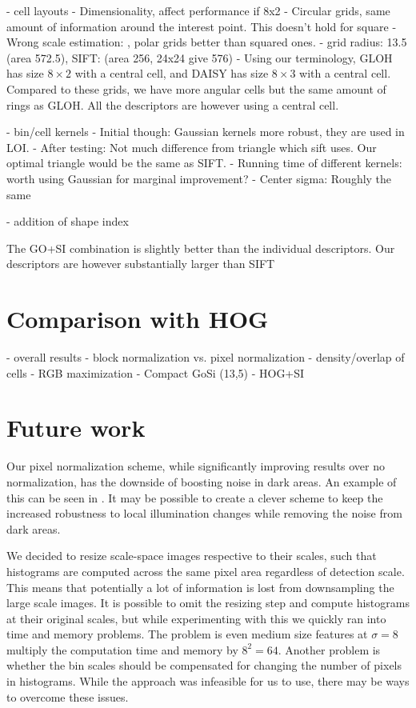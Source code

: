 \documentclass[thesis.tex]{subfiles}
\begin{document}
- cell layouts
 - Dimensionality, affect performance if 8x2
 - Circular grids, same amount of information around the interest point. This doesn't hold for square
 - Wrong scale estimation: \citet{cui2009scale}, polar grids better than squared ones.
 - grid radius: 13.5 (area 572.5), SIFT: (area 256, 24x24 give 576)
 - Using our terminology, GLOH has size $8\times2$ with a central cell, and DAISY has size $8 \times 3$ with a central cell. Compared to these grids, we have more angular cells but the same amount of rings as GLOH. All the descriptors are however using a central cell.

- bin/cell kernels
 - Initial though: Gaussian kernels more robust, they are used in LOI.
 - After testing: Not much difference from triangle which sift uses. Our optimal triangle would be the same as SIFT.
 - Running time of different kernels: worth using Gaussian for marginal improvement?
 - Center sigma: Roughly the same

- addition of shape index

The GO+SI combination is slightly better than the individual descriptors. Our descriptors are however substantially larger than SIFT

\section{Comparison with HOG}
- overall results
- block normalization vs. pixel normalization
- density/overlap of cells
- RGB maximization
- Compact GoSi (13,5)
- HOG+SI

\section{Future work} %
%
Our pixel normalization scheme, while significantly improving results over no normalization, has the downside of boosting noise in dark areas. An example of this can be seen in . It may be possible to create a clever scheme to keep the increased robustness to local illumination changes while removing the noise from dark areas.

We decided to resize scale-space images respective to their scales, such that histograms are computed across the same pixel area regardless of detection scale. This means that potentially a lot of information is lost from downsampling the large scale images. It is possible to omit the resizing step and compute histograms at their original scales, but while experimenting with this we quickly ran into time and memory problems. The problem is even medium size features at $\sigma = 8$ multiply the computation time and memory by $8^2 = 64$. Another problem is whether the bin scales should be compensated for changing the number of pixels in histograms. While the approach was infeasible for us to use, there may be ways to overcome these issues.
\end{document}
